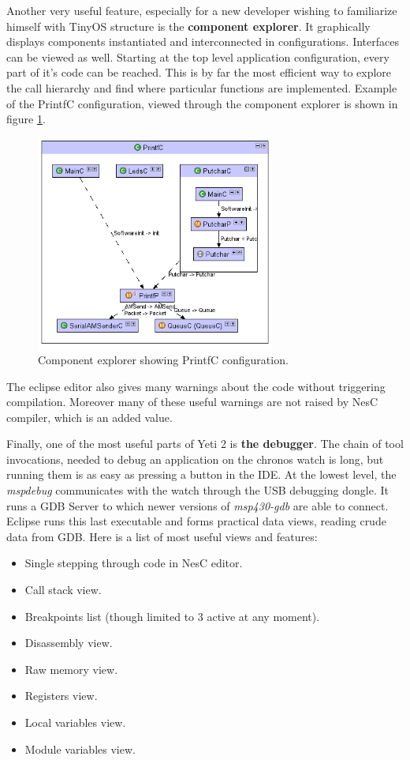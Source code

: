 Another very useful feature, especially for a new developer wishing to
familiarize himself with TinyOS structure is the {\bf component
explorer}. It graphically displays components instantiated and
interconnected in configurations. Interfaces can be viewed as well.
Starting at the top level application configuration, every part of
it's code can be reached. This is by far the most efficient way to
explore the call hierarchy and find where particular functions are
implemented. Example of the PrintfC configuration, viewed through
the component explorer is shown in figure
\ref{fig:eclipse_compexp}.

\begin{figure}[h]
  \centering
  \includegraphics[width=0.7\textwidth]{img/eclipse_compexp.png}
  \caption{Component explorer showing PrintfC configuration.}
  \label{fig:eclipse_compexp}
\end{figure}

The eclipse editor also gives many warnings about the code without
triggering compilation. Moreover many of these useful warnings are not
raised by NesC compiler, which is an added value. 

Finally, one of the most useful parts of Yeti 2 is {\bf the debugger}.
The chain of tool invocations, needed to debug an application on the
chronos watch is long, but running them is as easy as pressing a
button in the IDE. At the lowest level, the \emph{mspdebug}
communicates with the watch through the USB debugging dongle. It runs
a GDB Server to which newer versions of \emph{msp430-gdb} are able to
connect. Eclipse runs this last executable and forms practical data
views, reading crude data from GDB. Here is a list of most useful
views and features:
\begin{itemize}
  \item Single stepping through code in NesC editor.
  \item Call stack view.
  \item Breakpoints list (though limited to 3 active at any moment).
  \item Disassembly view.
  \item Raw memory view.
  \item Registers view.
  \item Local variables view.
  \item Module variables view.
\end{itemize}

